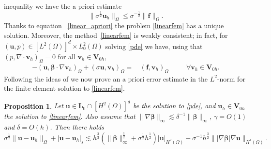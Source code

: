 \documentclass[10pt]{amsart}
\numberwithin{equation}{section}
\newtheorem{proposition}[theorem]{Proposition}
\theoremstyle{definition}
\theoremstyle{remark}
\renewcommand{\(}{\bigl(}
\renewcommand{\)}{\bigr)}
\newcommand{\bld}[1]{\boldsymbol{#1}}
\newcommand{\bv}{\bld{v}}
\newcommand{\bu}{\bld{u}}
\newcommand{\bff}{\bld{f}}
\newcommand{\bV}{\bld{V}}
\newcommand{\bL}{\bld{L}}
\newcommand{\bbeta}{{\bm \beta}}
\begin{document}
inequality we have the a priori
estimate
\begin{equation}\label{linear_apriori}
\|\sigma^{\frac12} \bu_h\|_\Omega \leq \sigma^{-\frac12} \|\bff\|_\Omega.
\end{equation}
Thanks to equation ~\eqref{linear_apriori} the problem \eqref{linearfem} has a unique solution. Moreover, the
method~\eqref{linearfem}  is weakly consistent; in fact,  for $(\bu,p)
\in [L^2(\Omega)]^d \times L^2_0(\Omega)$ solving \eqref{pde} we have,
using that $(p,\nabla \cdot  \bv_h)_\Omega= 0$ for all $\bv_h \in \bV_{0h}$,
\begin{subequations}\label{weak}
\begin{alignat}{2}
-(\bu, \bbeta \cdot \nabla \bv_h)_\Omega+(\sigma \bu, \bv_h)_\Omega
=&\, (\bff,\bv_h)_\Omega\quad && \forall \bv_h \in \bV_{0h}.
\end{alignat}
\end{subequations}
%
Following the ideas of \cite{BBG20} we now prove an a priori error estimate
in the $L^2$-norm for the finite element solution to
\eqref{linearfem}.
\begin{proposition}\label{prop:lin_error_est}
Let $\bu \in \bL_0 \cap[H^2(\Omega)]^d$ be the solution to
\eqref{pde},  and $\bu_h \in \bV_{0h}$ the solution to
\eqref{linearfem}. Also assume that $\|\nabla
\bbeta\|_{\infty} \lesssim \delta^{-1} \|
\bbeta\|_{\infty}$, $\gamma = O(1)$ and $\delta = O(h)$. Then there holds
\[
\sigma^{\frac12} \|\bu - \bu_h\|_\Omega + |\bu- \bu_h|_s
\lesssim h^{\frac32} (\|\bbeta\|^{\frac12}_{\infty}
+ \sigma^{\frac12} h^{\frac12}) |\bu|_{H^2(\Omega)} + \sigma^{-1} h^{\frac32} \||\nabla
\bbeta| \nabla \bu\|_{H^1(\Omega)}.
\]
\end{proposition}
\end{document}
